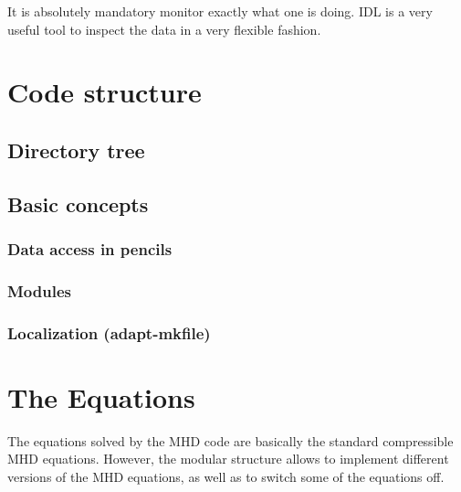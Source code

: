 \documentclass[12pt,twoside,notitlepage,a4paper]{article}
\begin{document}
It is absolutely mandatory monitor exactly what one is doing.
IDL is a very useful tool to inspect the data in a very flexible fashion.


\section{Code structure}


\subsection{Directory tree}



\subsection{Basic concepts}


\subsubsection{Data access in pencils}


\subsubsection{Modules}


\subsubsection{Localization (adapt-mkfile)}




\section{The Equations}

The equations solved by the MHD code are basically the standard
compressible MHD equations. However, the modular structure allows to
implement different versions of the MHD equations, as well as to switch
some of the equations off.

\end{document}
